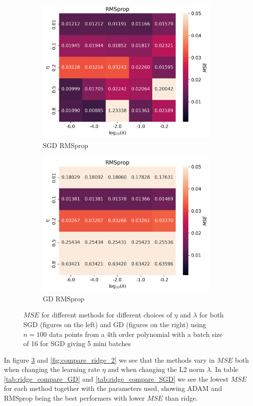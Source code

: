 \documentclass[11pt]{article}
\begin{document}
\begin{figure}[H]
    \begin{subfigure}{.5\textwidth}
        \centering
        \includegraphics[width=\textwidth]{../figures/RMSprop_SGD_eta_lmb.png}
        \caption{SGD RMSprop}
        \label{fig:}
    \end{subfigure}
    \begin{subfigure}{.5\textwidth}
        \centering
        \includegraphics[width=\textwidth]{../figures/RMSprop_GD_eta_lmb.png}
        \caption{GD RMSprop}
        \label{fig:}
    \end{subfigure}
    \caption{$MSE$ for different methods for different choices of $\eta$ and $\lambda$ for both SGD (figures on the left) and GD (figures on the right) using $n=100$ data points from a 4th order polynomial with a batch size of 16 for SGD giving 5 mini batches}
    \label{fig:compare_ridge}
\end{figure}
In figure \ref{fig:compare_ridge} and \ref{fig:compare_ridge_2} we see that the methods vary in $MSE$ both when changing the learning rate $\eta$ and when changing the L2 norm $\lambda$. In table \ref{tab:ridge_compare_GD} and \ref{tab:ridge_compare_SGD} we see the lowest $MSE$ for each method together with the parameters used, showing ADAM and RMSprop being the best performers with lower $MSE$ than ridge.
\end{document}

